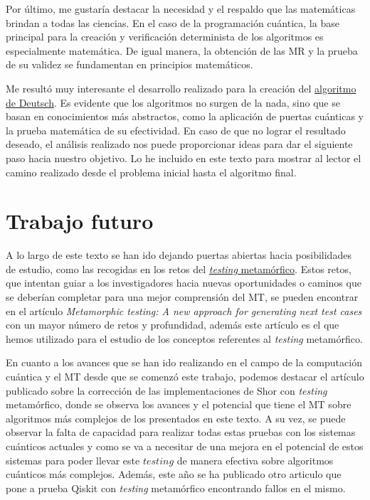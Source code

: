 Por último, me gustaría destacar la necesidad y el respaldo que las matemáticas brindan a todas las ciencias. En el caso de la programación cuántica, la base principal para la creación y verificación determinista de los algoritmos es especialmente matemática. De igual manera, la obtención de las MR y la prueba de su validez se fundamentan en principios matemáticos.\newline

Me resultó muy interesante el desarrollo realizado para la creación del \hyperref[Sec3.2:Deutsch]{algoritmo de Deutsch}.  Es evidente que los algoritmos no surgen de la nada, sino que se basan en conocimientos más abstractos, como la aplicación de puertas cuánticas y la prueba matemática de su efectividad. En caso de que no lograr el resultado deseado, el análisis realizado nos puede proporcionar ideas para dar el siguiente paso hacia nuestro objetivo. Lo he incluido en este texto para mostrar al lector el camino realizado desde el problema inicial hasta el algoritmo final.

\section{Trabajo futuro}
\label{Sec5.2:Futuro}

A lo largo de este texto se han ido dejando puertas abiertas hacia posibilidades de estudio, como las recogidas en los retos del \hyperref[Sec2.4:Metamorfico]{\textit{testing} metamórfico}. Estos retos, que intentan guiar a los investigadores hacia nuevas oportunidades o caminos que se deberían completar para una mejor comprensión del MT, se pueden encontrar en el artículo \textit{Metamorphic testing: A new approach for generating next test cases}\cite{AR:MTmain:2008} con un mayor número de retos y profundidad, además este artículo es el que hemos utilizado para el estudio de los conceptos referentes al \textit{testing} metamórfico.\newline

En cuanto a los avances que se han ido realizando en el campo de la computación cuántica y el MT desde que se comenzó este trabajo, podemos destacar el artículo publicado sobre la corrección de las implementaciones de Shor con \textit{testing} metamórfico\cite{metamorphicShor:2022}, donde se observa los avances y el potencial que tiene el MT sobre algoritmos más complejos de los presentados en este texto. A su vez, se puede observar la falta de capacidad para realizar todas estas pruebas con los sistemas cuánticos actuales y como se va a necesitar de una mejora en el potencial de estos sistemas para poder llevar este $testing$ de manera efectiva sobre algoritmos cuánticos más complejos. Además, este año se ha publicado otro articulo que pone a prueba Qiskit con \textit{testing} metamórfico\cite{AR:QiskitMT:2023} encontrando fallos en el mismo.\newline

